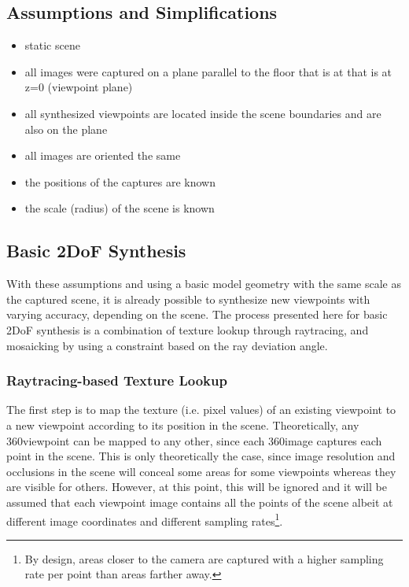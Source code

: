 \subsection{Assumptions and Simplifications}
\begin{itemize}
  \item static scene
  \item all images were captured on a plane parallel to the floor that is at that is at z=0 (viewpoint plane)
  \item all synthesized viewpoints are located inside the scene boundaries and are also on the plane
  \item all images are oriented the same
  \item the positions of the captures are known
  \item the scale (radius) of the scene is known
\end{itemize}

\subsection{Basic 2DoF Synthesis}
With these assumptions and using a basic model geometry with the same scale as the captured scene, it is already possible to synthesize new viewpoints with varying accuracy, depending on the scene. The process presented here for basic 2DoF synthesis is a combination of texture lookup through raytracing, and mosaicking by using a constraint based on the ray deviation angle.

\subsubsection{Raytracing-based Texture Lookup}
The first step is to map the texture (i.e. pixel values) of an existing viewpoint to a new viewpoint according to its position in the scene. Theoretically, any 360\degree viewpoint can be mapped to any other, since each 360\degree image captures each point in the scene. This is only theoretically the case, since image resolution and occlusions in the scene will conceal some areas for some viewpoints whereas they are visible for others. However, at this point, this will be ignored and it will be assumed that each viewpoint image contains all the points of the scene albeit at different image coordinates and different sampling rates\footnote{By design, areas closer to the camera are captured with a higher sampling rate per point than areas farther away.}. 

